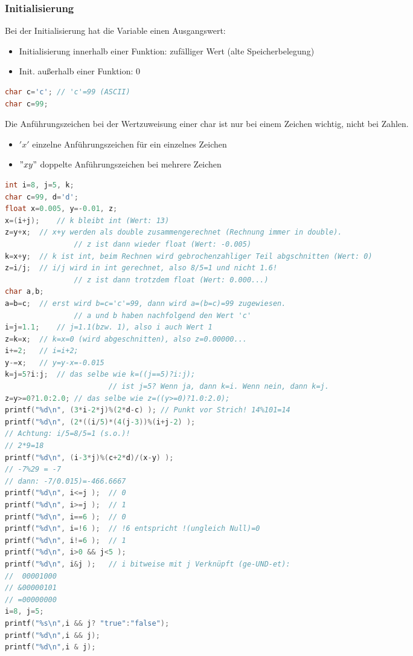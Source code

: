 \subsubsection{Initialisierung}
Bei der Initialisierung hat die Variable einen Ausgangswert:
\begin{itemize}
\item Initialisierung innerhalb einer Funktion: zufälliger Wert (alte Speicherbelegung)
\item Init. außerhalb einer Funktion: 0
\end{itemize}

\begin{lstlisting}[language=C]
char c='c';	// 'c'=99 (ASCII)
char c=99;
\end{lstlisting}
Die Anführungszeichen bei der Wertzuweisung einer char ist nur bei einem Zeichen wichtig, nicht bei Zahlen.
\begin{itemize}
\item $'x'$ einzelne Anführungszeichen für ein einzelnes Zeichen
\item $"xy"$ doppelte Anführungszeichen bei mehrere Zeichen
\end{itemize}

\begin{lstlisting}[language=C]
int i=8, j=5, k;
char c=99, d='d';
float x=0.005, y=-0.01, z;
x=(i+j);	// k bleibt int (Wert: 13)
z=y+x;	// x+y werden als double zusammengerechnet (Rechnung immer in double).
				// z ist dann wieder float (Wert: -0.005)
k=x+y;	// k ist int, beim Rechnen wird gebrochenzahliger Teil abgschnitten (Wert: 0)
z=i/j;	// i/j wird in int gerechnet, also 8/5=1 und nicht 1.6! 
				// z ist dann trotzdem float (Wert: 0.000...)
char a,b;
a=b=c;	// erst wird b=c='c'=99, dann wird a=(b=c)=99 zugewiesen. 
				// a und b haben nachfolgend den Wert 'c'
i=j=1.1;	// j=1.1(bzw. 1), also i auch Wert 1
z=k=x;	// k=x=0 (wird abgeschnitten), also z=0.00000...
i+=2;	// i=i+2;
y-=x;	// y=y-x=-0.015
k=j=5?i:j;	// das selbe wie k=((j==5)?i:j);
						// ist j=5? Wenn ja, dann k=i. Wenn nein, dann k=j.
z=y>=0?1.0:2.0;	// das selbe wie z=((y>=0)?1.0:2.0);
printf("%d\n", (3*i-2*j)%(2*d-c) );	// Punkt vor Strich! 14%101=14
printf("%d\n", (2*((i/5)*(4(j-3))%(i+j-2) );
// Achtung: i/5=8/5=1 (s.o.)!
// 2*9=18
printf("%d\n", (i-3*j)%(c+2*d)/(x-y) );
// -7%29 = -7
// dann: -7/0.015)=-466.6667
printf("%d\n", i<=j );	// 0
printf("%d\n", i>=j );	// 1
printf("%d\n", i==6 );	// 0
printf("%d\n", i=!6 );	// !6 entspricht !(ungleich Null)=0
printf("%d\n", i!=6 );	// 1
printf("%d\n", i>0 && j<5 );
printf("%d\n", i&j );	// i bitweise mit j Verknüpft (ge-UND-et):
//  00001000
// &00000101
// =00000000
i=8, j=5;
printf("%s\n",i && j? "true":"false");
printf("%d\n",i && j);
printf("%d\n",i & j);
\end{lstlisting}

